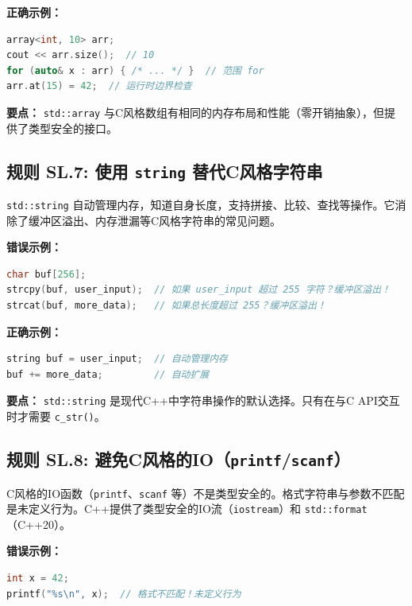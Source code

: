 \textbf{正确示例：}

\begin{lstlisting}[language=C++]
array<int, 10> arr;
cout << arr.size();  // 10
for (auto& x : arr) { /* ... */ }  // 范围 for
arr.at(15) = 42;  // 运行时边界检查
\end{lstlisting}

\textbf{要点：} \texttt{std::array} 与C风格数组有相同的内存布局和性能（零开销抽象），但提供了类型安全的接口。

\subsection*{\textbf{规则 SL.7:} 使用 \texttt{string} 替代C风格字符串}

\texttt{std::string} 自动管理内存，知道自身长度，支持拼接、比较、查找等操作。它消除了缓冲区溢出、内存泄漏等C风格字符串的常见问题。

\textbf{错误示例：}

\begin{lstlisting}[language=C++]
char buf[256];
strcpy(buf, user_input);  // 如果 user_input 超过 255 字符？缓冲区溢出！
strcat(buf, more_data);   // 如果总长度超过 255？缓冲区溢出！
\end{lstlisting}

\textbf{正确示例：}

\begin{lstlisting}[language=C++]
string buf = user_input;  // 自动管理内存
buf += more_data;         // 自动扩展
\end{lstlisting}

\textbf{要点：} \texttt{std::string} 是现代C++中字符串操作的默认选择。只有在与C API交互时才需要 \texttt{c\_str()}。

\subsection*{\textbf{规则 SL.8:} 避免C风格的IO（\texttt{printf}/\texttt{scanf}）}

C风格的IO函数（\texttt{printf}、\texttt{scanf} 等）不是类型安全的。格式字符串与参数不匹配是未定义行为。C++提供了类型安全的IO流（\texttt{iostream}）和 \texttt{std::format}（C++20）。

\textbf{错误示例：}

\begin{lstlisting}[language=C++]
int x = 42;
printf("%s\n", x);  // 格式不匹配！未定义行为
\end{lstlisting}


